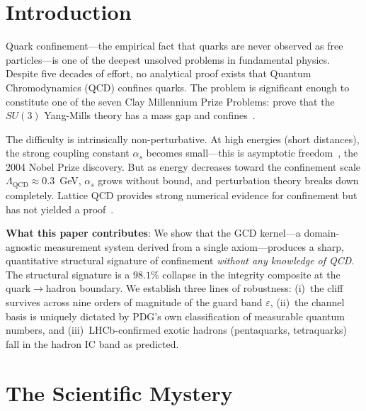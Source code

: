 \documentclass[11pt,a4paper]{article}
\theoremstyle{plain}
\theoremstyle{definition}
\theoremstyle{remark}
\newcommand{\eps}{\varepsilon}
\newcommand{\LQCD}{\Lambda_{\mathrm{QCD}}}
\begin{document}
\vspace{6pt}

\section{Introduction}\label{sec:intro}

Quark confinement---the empirical fact that quarks are never
observed as free particles---is one of the deepest unsolved
problems in fundamental physics.  Despite five decades of effort,
no analytical proof exists that Quantum Chromodynamics (QCD)
confines quarks.  The problem is significant enough to constitute
one of the seven Clay Millennium Prize Problems: prove that the
$SU(3)$ Yang-Mills theory has a mass gap and
confines~\cite{jaffe2006quantum}.

The difficulty is intrinsically non-perturbative.  At high energies
(short distances), the strong coupling constant $\alpha_s$ becomes
small---this is asymptotic freedom~\cite{gross1973,politzer1973},
the 2004 Nobel Prize discovery.  But as energy decreases toward the
confinement scale $\LQCD \approx 0.3$~GeV, $\alpha_s$ grows without
bound, and perturbation theory breaks down completely.  Lattice QCD
provides strong numerical evidence for confinement but has not
yielded a proof~\cite{wilson1974confinement}.

\textbf{What this paper contributes}: We show that the GCD
kernel---a domain-agnostic measurement system derived from a
single axiom---produces a sharp, quantitative structural signature
of confinement \emph{without any knowledge of QCD}.  The
structural signature is a $98.1\%$ collapse in the integrity
composite at the quark$\to$hadron boundary.  We establish three
lines of robustness: (i)~the cliff survives across nine orders
of magnitude of the guard band $\eps$,
(ii)~the channel basis is uniquely dictated by PDG's own
classification of measurable quantum numbers, and
(iii)~LHCb-confirmed exotic hadrons (pentaquarks, tetraquarks)
fall in the hadron IC band as predicted.


\section{The Scientific Mystery}\label{sec:mystery}
\end{document}
